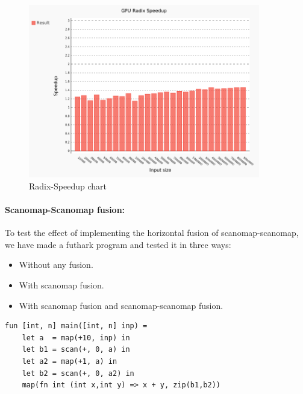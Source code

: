 \documentclass[11pt]{article}
\begin{document}
\begin{figure}[hb]
  \centering
    \includegraphics[width=0.9\textwidth]{images/radix-comparing.png}
  \caption{Radix-Speedup chart}
  \label{fig:scanomap-radix}
\end{figure}

\paragraph*{Scanomap-Scanomap fusion:}
To test the effect of implementing the horizontal fusion of scanomap-scanomap, we have made a futhark program and tested it in three ways:

\begin{itemize}
\item Without any fusion.
\item With scanomap fusion.
\item With scanomap fusion and scanomap-scanomap fusion.
\end{itemize}

\begin{lstlisting}[caption=Scanomap-scanomap benchmark program] 
fun [int, n] main([int, n] inp) =
    let a  = map(+10, inp) in
    let b1 = scan(+, 0, a) in
    let a2 = map(+1, a) in
    let b2 = scan(+, 0, a2) in
    map(fn int (int x,int y) => x + y, zip(b1,b2))

\end{lstlisting}
\end{document}
